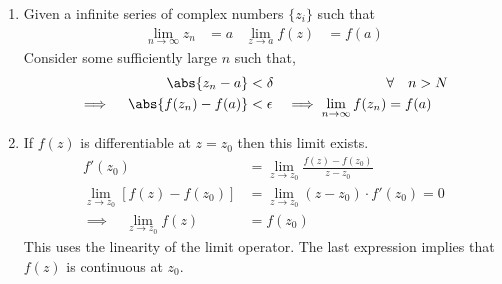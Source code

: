 \begin{enumerate}
\begin{enumerate}
              \item Given a infinite series of complex numbers $ \{z_i\} $ such that
                    \begin{align}
                        \lim_{n \to \infty} z_n & = a    &
                        \lim_{z \to a} f(z)     & = f(a)
                    \end{align}
                    Consider some sufficiently large $ n $ such that,
                    \begin{align}
                        \abs{z_n - a}                      & < \delta            &
                                                           & \forall \quad n > N   \\
                        \implies \quad \abs{f(z_n) - f(a)} & < \epsilon          &
                        \implies \lim_{n \to
                        \infty}f(z_n)                      & = f(a)
                    \end{align}

              \item If $ f(z) $ is differentiable at $ z = z_0 $ then this limit
                    exists.
                    \begin{align}
                        f'(z_0)                              &
                        = \lim_{z \to z_0} \frac{f(z) - f(z_0)}{z - z_0} \\
                        \lim_{z \to z_0} [f(z) - f(z_0)]     &
                        = \lim_{z \to z_0} (z - z_0) \cdot f'(z_0) = 0   \\
                        \implies \quad \lim_{z \to z_0} f(z) & = f(z_0)
                    \end{align}
                    This uses the linearity of the limit operator. The last expression
                    implies that $ f(z) $ is continuous at $ z_0 $.


\end{enumerate}
\end{enumerate}
